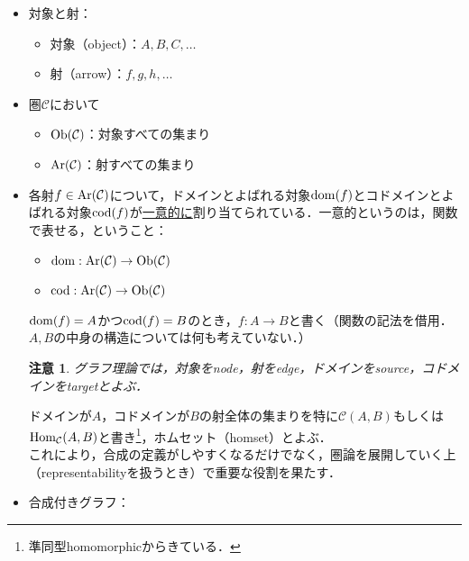 \documentclass[dvipdfmx,a4j,10pt]{jsarticle}
\theoremstyle{mystyle1}
\theoremstyle{mystyle2}
\newtheorem{note*}{注意}
\theoremstyle{mystyle3}
\newcommand{\Ob}{{\rm Ob}}
\newcommand{\Ar}{{\rm Ar}}
\newcommand{\dom}{{\rm dom}}
\newcommand{\cod}{{\rm cod}}
\newcommand{\Hom}{{\rm Hom}}
\begin{document}
\begin{itemize}
    \item 対象と射：
          \begin{itemize}
              \item 対象（object）：$A,B,C,\ldots$
              \item 射（arrow）：$f,g,h,\ldots$
          \end{itemize}
    \item 圏$\mathcal{C}$において
          \begin{itemize}
              \item $\Ob(\mathcal{C})$：対象すべての集まり
              \item $\Ar(\mathcal{C})$：射すべての集まり
          \end{itemize}
    \item 各射$f\in \Ar(\mathcal{C})$について，ドメインとよばれる対象$\dom(f)$とコドメインとよばれる対象$\cod(f)$が\underline{一意的に}割り当てられている．一意的というのは，関数で表せる，ということ：
          \begin{itemize}
              \item $\dom :\Ar(\mathcal{C})\to \Ob(\mathcal{C})$
              \item $\cod :\Ar(\mathcal{C})\to \Ob(\mathcal{C})$
          \end{itemize}
          $\dom(f)=A$かつ$\cod(f)=B$のとき，$f:A\to B$と書く（関数の記法を借用．$A,B$の中身の構造については何も考えていない．）
          \begin{note*}
              グラフ理論では，対象をnode，射をedge，ドメインをsource，コドメインをtargetとよぶ．
          \end{note*}
          ドメインが$A$，コドメインが$B$の射全体の集まりを特に$\mathcal{C}(A,B)$もしくは$\Hom_{\mathcal{C}}(A,B)$と書き\footnote{準同型homomorphicからきている．}，ホムセット（homset）とよぶ．\\
          これにより，合成の定義がしやすくなるだけでなく，圏論を展開していく上（representabilityを扱うとき）で重要な役割を果たす．
    \item 合成付きグラフ：
          \begin{center}
              \vspace{-1zh}
\end{center}
\end{itemize}
\end{document}
